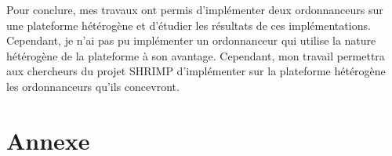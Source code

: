 \documentclass{article}
\begin{document}
    Pour conclure, mes travaux ont permis d'implémenter deux ordonnanceurs sur une plateforme hétérogène et d'étudier les résultats de ces implémentations. Cependant, je n'ai pas pu implémenter un ordonnanceur qui utilise la nature hétérogène de la plateforme à son avantage. Cependant, mon travail permettra aux chercheurs du projet SHRIMP d'implémenter sur la plateforme hétérogène les ordonnanceurs qu'ils concevront.
     

    \newpage

    \newpage
    \printnoidxglossaries %

    \newpage
    \listoffigures
    \lstlistoflistings



    \newpage
    \section*{Annexe}
    


    
\end{document}
